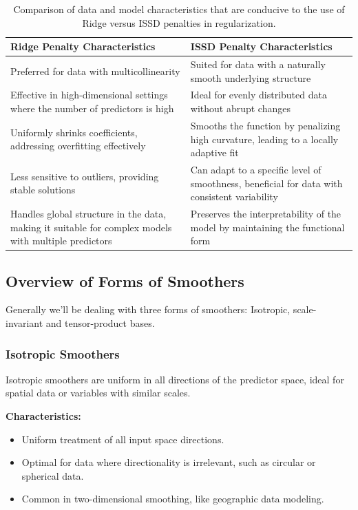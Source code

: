 \documentclass[12pt, twoside,hidelinks]{article}
\theoremstyle{definition}
\numberwithin{equation}{section}
\begin{document}
\begin{table}[H]
\centering
\begin{tabular}{p{}p{}}
\hline
\textbf{Ridge Penalty Characteristics} & \textbf{ISSD Penalty Characteristics} \\
\hline
Preferred for data with multicollinearity & Suited for data with a naturally smooth underlying structure \\
Effective in high-dimensional settings where the number of predictors is high & Ideal for evenly distributed data without abrupt changes \\
Uniformly shrinks coefficients, addressing overfitting effectively & Smooths the function by penalizing high curvature, leading to a locally adaptive fit \\
Less sensitive to outliers, providing stable solutions & Can adapt to a specific level of smoothness, beneficial for data with consistent variability \\
Handles global structure in the data, making it suitable for complex models with multiple predictors & Preserves the interpretability of the model by maintaining the functional form \\
\hline
\end{tabular}
\caption{Comparison of data and model characteristics that are conducive to the use of Ridge versus ISSD penalties in regularization.}
\label{table:ridge_vs_issd}
\end{table}

\subsection{Overview of Forms of Smoothers}\label{sec:smooth:overview}

Generally we'll be dealing with three forms of smoothers: Isotropic, scale-invariant and tensor-product bases.

\subsubsection{Isotropic Smoothers}\label{sec:smooth:overview:isotropic}
Isotropic smoothers are uniform in all directions of the predictor space, ideal for spatial data or variables with similar scales.

\textbf{Characteristics:}
\begin{itemize}
    \item Uniform treatment of all input space directions.
    \item Optimal for data where directionality is irrelevant, such as circular or spherical data.
    \item Common in two-dimensional smoothing, like geographic data modeling.
\end{itemize}
\end{document}
